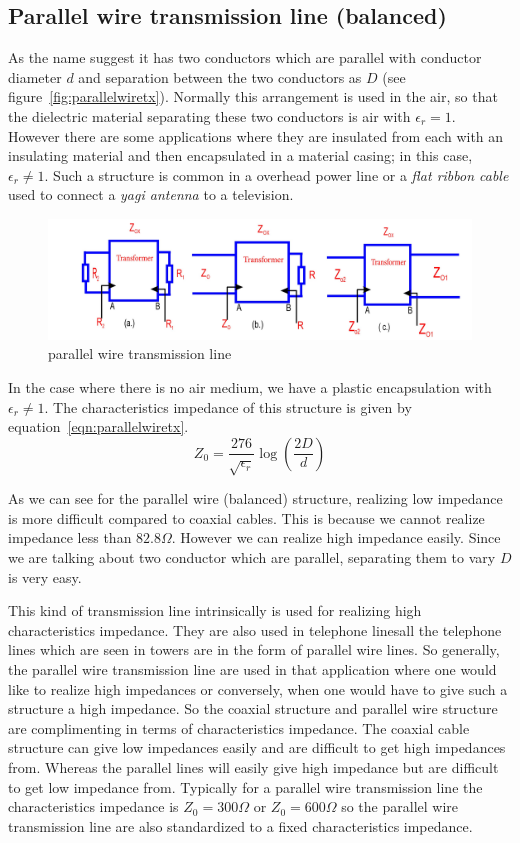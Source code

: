 \subsection{Parallel wire transmission line (balanced)} 
As the name suggest it has two conductors which are parallel with conductor diameter $d$ and separation between the two conductors as $D$ (see figure~\ref{fig:parallelwiretx}). Normally this arrangement is used in the air, so that the dielectric material separating these two conductors is air with $\epsilon_r=1$. However there are some applications where they are insulated from each with an insulating material and then encapsulated in a material casing; in this case, $\epsilon_r\neq1$. Such a structure is common in a overhead power line or a \emph{flat ribbon cable} used to connect a \emph{yagi antenna} to a television.
\begin{figure}[h]
\centering
\includegraphics[width=1\linewidth]{./graphics/fig8}
\caption{parallel wire transmission line}
\end{figure}

In the case where there is no air medium, we have a plastic encapsulation with $\epsilon_r\neq1$. The characteristics impedance of this structure is given by equation~\ref{eqn:parallelwiretx}.
\begin{equation}
Z_0 =\dfrac{276}{\sqrt{\epsilon_r}}\log(\dfrac{2D}{d})
\label{eqn:parallelwiretx}
\end{equation}

As we can see for the parallel wire (balanced) structure, realizing low impedance is more difficult compared to coaxial cables. This is because we cannot realize impedance less than $82.8\varOmega$. However we can realize high impedance easily. Since we are talking about two conductor which are parallel, separating them to vary $D$ is very easy.

This kind of transmission line intrinsically is used for realizing high characteristics impedance. They are also used in telephone lines\textemdash\;all the telephone lines which are seen in towers are in the form of parallel wire lines. So generally, the parallel wire transmission line are used in that application where one would like to realize high impedances or conversely, when one would have to give such a structure a high impedance. So the coaxial structure and parallel wire structure are complimenting in terms of characteristics impedance. The coaxial cable structure can give low impedances easily and are difficult to get high impedances from. Whereas the parallel lines will easily give high impedance but are difficult to get low impedance from. Typically for a parallel wire transmission line the characteristics impedance is $Z_0 =300\varOmega$ or $Z_0 =600\varOmega$ so the parallel wire transmission line are also standardized to a fixed characteristics impedance.

